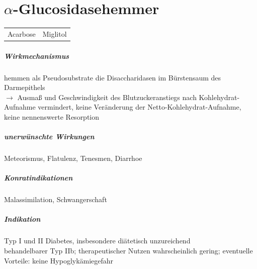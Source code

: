 \documentclass[10pt,a4paper]{report}
\begin{document}
\section{$\alpha$-Glucosidasehemmer} %
\label{sec:_glucosidasehemmer}
\begin{tabularx}{\textwidth}{XX}
Acarbose&Miglitol\\
\end{tabularx}
\subparagraph{Wirkmechanismus} %
\label{subp:wirkmechanismus}
hemmen als Pseudosubstrate die Disaccharidasen 
im Bürstensaum des Darmepithels\\
$\rightarrow$ 	Ausmaß und Geschwindigkeit des Blutzuckeranstiegs nach Kohlehydrat-Aufnahme vermindert, keine Veränderung der Netto-Kohlehydrat-Aufnahme, keine nennenswerte Resorption
\subparagraph{unerwünschte Wirkungen} %
\label{subp:unerw_nschte_wirkungen}
Meteorismus, Flatulenz, Tenesmen, Diarrhoe
\subparagraph{Konratindikationen} %
\label{subp:konratindikationen}
Malassimilation, Schwangerschaft
\subparagraph{Indikation} %
\label{subp:indikation}
Typ I und II Diabetes, insbesondere diätetisch unzureichend\\
behandelbarer Typ IIb; therapeutischer Nutzen wahrscheinlich gering; eventuelle Vorteile: keine Hypoglykämiegefahr
\end{document}
